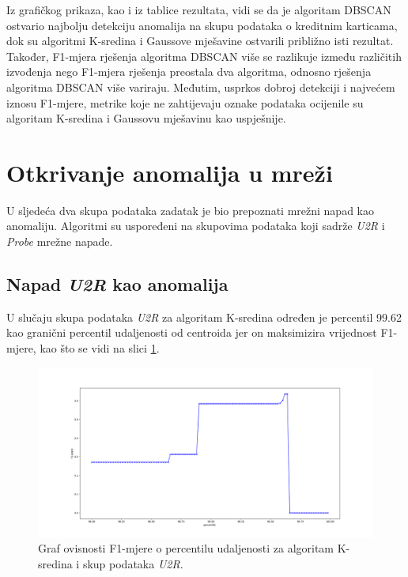 \documentclass[utf8, diplomski, numeric]{fer}
\begin{document}
Iz grafičkog prikaza, kao i iz tablice rezultata, vidi se da je algoritam DBSCAN ostvario najbolju detekciju anomalija na skupu podataka o kreditnim karticama, dok su algoritmi K-sredina i Gaussove mješavine ostvarili približno isti rezultat. Također, F1-mjera rješenja algoritma DBSCAN više se razlikuje između različitih izvođenja nego F1-mjera rješenja preostala dva algoritma, odnosno rješenja algoritma DBSCAN više variraju. Međutim, usprkos dobroj detekciji i najvećem iznosu F1-mjere, metrike koje ne zahtijevaju oznake podataka ocijenile su algoritam K-sredina i Gaussovu mješavinu kao uspješnije.

\section{Otkrivanje anomalija u mreži}
U sljedeća dva skupa podataka zadatak je bio prepoznati mrežni napad kao anomaliju. Algoritmi su uspoređeni na skupovima podataka koji sadrže \textit{U2R} i \textit{Probe}  mrežne napade.

\subsection{Napad \textit{U2R} kao anomalija}
U slučaju skupa podataka \textit{U2R} za algoritam K-sredina određen je percentil 99.62 kao granični percentil udaljenosti od centroida jer on maksimizira vrijednost F1-mjere, kao što se vidi na slici \ref{fig:u2r-kmeans}.

\begin{figure}[h!]
\includegraphics[width=1\textwidth]{images/u2r-kmeans-f1.png}
\centering
\caption{Graf ovisnosti F1-mjere o percentilu udaljenosti za algoritam K-sredina i skup podataka \textit{U2R}.}
\label{fig:u2r-kmeans}
\end{figure}
\end{document}

